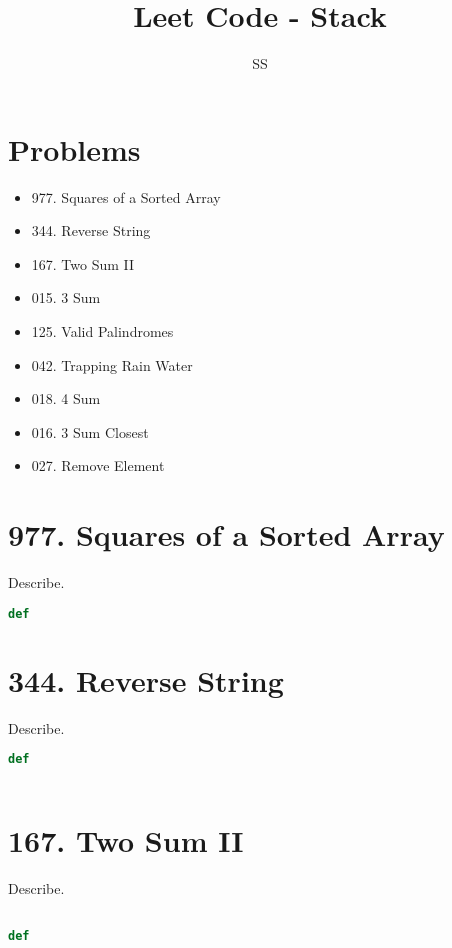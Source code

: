 \documentclass{article}
\title{Leet Code - Stack}
\author{SS}
\begin{document}
\maketitle

\section{Problems}
\begin{itemize}
    \item 977. Squares of a Sorted Array
    \item 344. Reverse String
    \item 167. Two Sum II
    \item 015. 3 Sum
    \item 125. Valid Palindromes
    \item 042. Trapping Rain Water
    \item 018. 4 Sum
    \item 016. 3 Sum Closest
    \item 027. Remove Element
\end{itemize}
\section{977. Squares of a Sorted Array}
\begin{tcolorbox}[colback=red!5!white, colframe=red!50!black,title=977. Squares of a Sorted Array ] 
Describe.
\end{tcolorbox}
\begin{lstlisting}[language=Python]
def 

\end{lstlisting}
\section{344. Reverse String}
\begin{tcolorbox}[colback=red!5!white, colframe=red!50!black,title=344. Reverse String ] 
Describe.
\end{tcolorbox}
\begin{lstlisting}[language=Python]
def 
                

\end{lstlisting}
\section{167. Two Sum II}
\begin{tcolorbox}[colback=red!5!white, colframe=red!50!black,title=167. Two Sum II ] 
Describe.
\end{tcolorbox}
\begin{lstlisting}[language=Python]

def 

\end{lstlisting}
\end{document}
